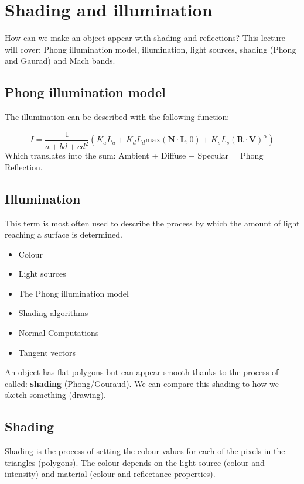 \section{Shading and illumination}
How can we make an object appear with shading and reflections? This lecture will cover: Phong illumination model, illumination, light sources, shading (Phong and Gaurad) and Mach bands.

	\subsection*{Phong illumination model}
	The illumination can be described with the following function:

		\begin{equation}
			I = \frac{1} {a+bd+cd^2}(K_aL_a+K_dL_d \text{max}(\textbf{N} \cdot \textbf{L},0) + K_sL_s(\textbf{R}\cdot \textbf{V})^{\alpha}) 	
		\end{equation}
	Which translates into the sum: Ambient + Diffuse + Specular = Phong Reflection.

	\subsection*{Illumination}
	This term is most often used to describe the process by which the amount of light reaching a surface is determined.

		\begin{itemize}
			\item Colour
			\item Light sources
			\item The Phong illumination model
			\item Shading algorithms
			\item Normal Computations
			\item Tangent vectors
		\end{itemize}

	An object has flat polygons but can appear smooth thanks to the process of called: \textbf{shading} (Phong/Gouraud). We can compare this shading to how we sketch something (drawing). 

	\subsection*{Shading}
	Shading is the process of setting the colour values for each of the pixels in the triangles (polygons). The colour depends on the light source (colour and intensity) and material (colour and reflectance properties). 

